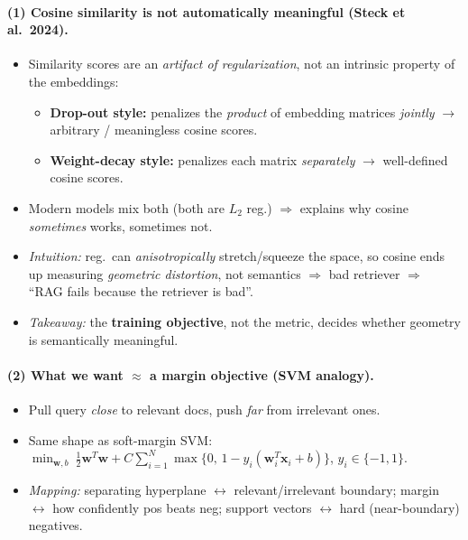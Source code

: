 \documentclass{article}
\begin{document}
\paragraph{(1) Cosine similarity is not automatically meaningful (Steck et al.\ 2024).}
\begin{itemize}
    \item Similarity scores are an \emph{artifact of regularization}, not an intrinsic property of the embeddings:
    \begin{itemize}
        \item \textbf{Drop-out style:} penalizes the \emph{product} of embedding matrices \emph{jointly} $\to$ arbitrary / meaningless cosine scores.
        \item \textbf{Weight-decay style:} penalizes each matrix \emph{separately} $\to$ well-defined cosine scores.
    \end{itemize}
    \item Modern models mix both (both are $L_2$ reg.) $\Rightarrow$ explains why cosine \emph{sometimes} works, sometimes not.
    \item \emph{Intuition:} reg.\ can \emph{anisotropically} stretch/squeeze the space, so cosine ends up measuring \emph{geometric distortion}, not semantics $\Rightarrow$ bad retriever $\Rightarrow$ ``RAG fails because the retriever is bad''.
    \item \emph{Takeaway:} the \textbf{training objective}, not the metric, decides whether geometry is semantically meaningful.
\end{itemize}

\paragraph{(2) What we want $\approx$ a margin objective (SVM analogy).}
\begin{itemize}
    \item Pull query \emph{close} to relevant docs, push \emph{far} from irrelevant ones.
    \item Same shape as soft-margin SVM: $\min_{\mathbf{w},b}\ \tfrac{1}{2}\mathbf{w}^T\mathbf{w} + C\sum_{i=1}^{N}\max\{0,\,1-y_i(\mathbf{w}_i^T\mathbf{x}_i+b)\}$, $y_i\in\{-1,1\}$.
    \item \emph{Mapping:} separating hyperplane $\leftrightarrow$ relevant/irrelevant boundary; margin $\leftrightarrow$ how confidently pos beats neg; support vectors $\leftrightarrow$ hard (near-boundary) negatives.
\end{itemize}
\end{document}
